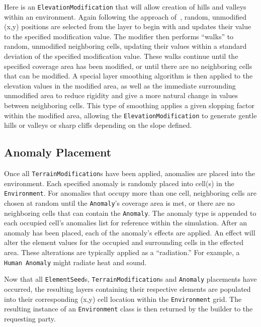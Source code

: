 Here is an \texttt{ElevationModification} that will allow creation of hills and valleys within an environment.
Again following the approach of~\cite{doran_controlled_2010}, random, unmodified (x,y) positions are selected from the layer to begin with and updates their value to the specified modification value.
The modifier then performs ``walks'' to random, unmodified neighboring cells, updating their values within a standard deviation of the specified modification value.
These walks continue until the specified coverage area has been modified, or until there are no neighboring cells that can be modified.
A special layer smoothing algorithm is then applied to the elevation values in the modified area, as well as the immediate surrounding unmodified area to reduce rigidity and give a more natural change in values between neighboring cells.
This type of smoothing applies a given slopping factor within the modified area, allowing the \texttt{ElevationModification} to generate gentle hills or valleys or sharp cliffs depending on the slope defined.


\subsection{Anomaly Placement} \label{subsec:anomaly_placement}
Once all \texttt{TerrainModification}s have been applied, anomalies are placed into the environment.
Each specified anomaly is randomly placed into cell(s) in the \texttt{Environment}.
For anomalies that occupy more than one cell, neighboring cells are chosen at random until the \texttt{Anomaly}'s coverage area is met, or there are no neighboring cells that can contain the \texttt{Anomaly}.
The anomaly type is appended to each occupied cell's anomalies list for reference within the simulation.
After an anomaly has been placed, each of the anomaly's effects are applied.
An effect will alter the element values for the occupied and surrounding cells in the effected area.
These alterations are typically applied as a ``radiation.''
For example, a \texttt{Human Anomaly} might radiate heat and sound.

Now that all \texttt{ElementSeed}s, \texttt{TerrainModification}s and \texttt{Anomaly} placements have occurred, the resulting layers containing their respective elements are populated into their corresponding (x,y) cell location within the \texttt{Environment} grid.
The resulting instance of an \texttt{Environment} class is then returned by the builder to the requesting party.



